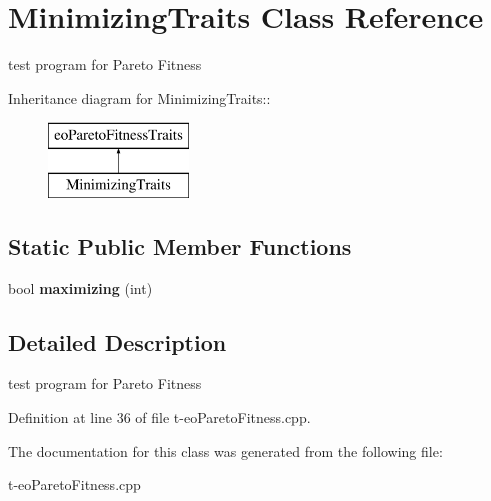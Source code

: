 \section{Minimizing\-Traits Class Reference}
\label{class_minimizing_traits}
test program for Pareto Fitness  


Inheritance diagram for Minimizing\-Traits::\begin{figure}[H]
\begin{center}
\leavevmode
\includegraphics[height=2cm]{class_minimizing_traits}
\end{center}
\end{figure}
\subsection*{Static Public Member Functions}
\begin{CompactItemize}
\item 
bool {\bf maximizing} (int)\label{class_minimizing_traits_e0}

\end{CompactItemize}


\subsection{Detailed Description}
test program for Pareto Fitness 



Definition at line 36 of file t-eo\-Pareto\-Fitness.cpp.

The documentation for this class was generated from the following file:\begin{CompactItemize}
\item 
t-eo\-Pareto\-Fitness.cpp\end{CompactItemize}
